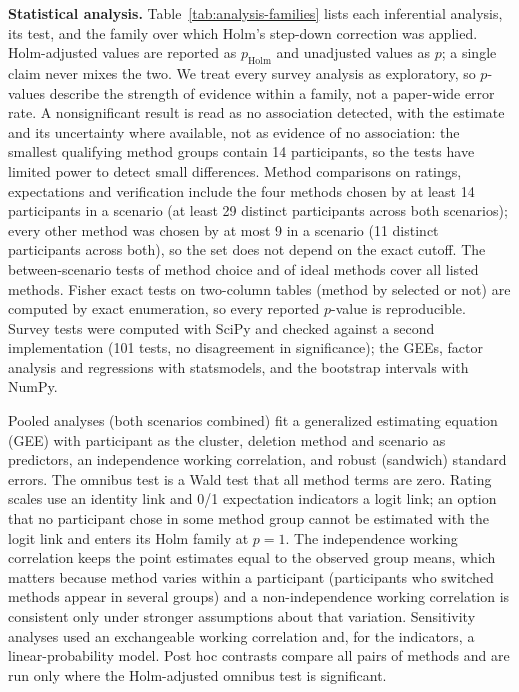 \documentclass[conference,compsoc]{IEEEtran}
\begin{document}
\textbf{Statistical analysis.} Table~\ref{tab:analysis-families} lists each
inferential analysis, its test, and the family over which Holm's step-down
correction was applied. Holm-adjusted values are reported as
$p_{\mathrm{Holm}}$ and unadjusted values as $p$; a single claim never
mixes the two. We treat every survey analysis as exploratory, so $p$-values
describe the strength of evidence within a family, not a paper-wide error
rate. A nonsignificant result is read as no association detected, with
the estimate and its uncertainty where available, not as evidence of no
association: the smallest qualifying method groups contain 14 participants,
so the tests have limited power to detect small differences. Method
comparisons on ratings, expectations and verification include the four
methods chosen by at least 14 participants in a scenario (at least 29
distinct participants across both scenarios); every other method was chosen by
at most 9 in a scenario (11 distinct participants across both), so the set does
not depend on the exact cutoff. The between-scenario
tests of method choice and of ideal methods cover all listed methods. Fisher
exact tests on two-column tables (method by selected or not) are computed by
exact enumeration, so every reported $p$-value is reproducible. Survey
tests were computed with SciPy and checked against a second implementation
(101 tests, no disagreement in significance); the GEEs, factor analysis and
regressions with statsmodels, and the bootstrap intervals with NumPy.

Pooled analyses (both scenarios combined) fit a generalized estimating
equation (GEE) with participant as the cluster, deletion method and scenario
as predictors, an independence working correlation, and robust (sandwich)
standard errors. The omnibus test is a Wald test that all method terms are
zero. Rating scales use an identity link and 0/1 expectation indicators a
logit link; an option that no participant chose in some method group cannot be
estimated with the logit link and enters its Holm family at $p=1$. The
independence working correlation keeps the point estimates equal to the
observed group means, which matters because method varies within a
participant (participants who switched methods appear in several groups) and
a non-independence working correlation is consistent only under stronger
assumptions about that variation. Sensitivity analyses used an exchangeable
working correlation and, for the indicators, a linear-probability model.
Post hoc contrasts compare all pairs of methods and are run only where the
Holm-adjusted omnibus test is significant.
\end{document}
